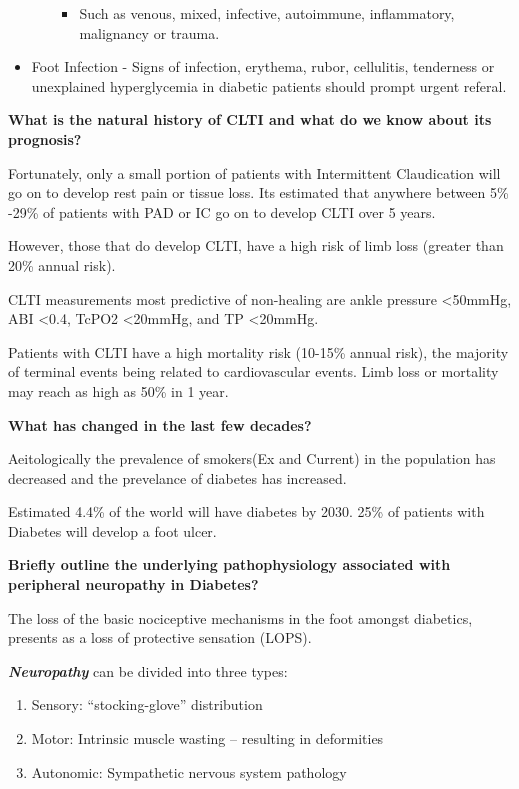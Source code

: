 \documentclass[
]{book}
\providecommand{\tightlist}{%
  \setlength{\itemsep}{0pt}\setlength{\parskip}{0pt}}
\begin{document}
\begin{itemize}
\begin{itemize}
    \begin{itemize}
    \tightlist
    \item
      Such as venous, mixed, infective, autoimmune, inflammatory,
      malignancy or trauma.
    \end{itemize}
  \end{itemize}
\item
  Foot Infection - Signs of infection, erythema, rubor, cellulitis,
  tenderness or unexplained hyperglycemia in diabetic patients should
  prompt urgent referal.\citep{kalish2010}
\end{itemize}

\textbf{What is the natural history of CLTI and what do we know about its
prognosis?}

Fortunately, only a small portion of patients with Intermittent
Claudication will go on to develop rest pain or tissue loss. Its
estimated that anywhere between 5\% -29\% of patients with PAD or IC go on
to develop CLTI over 5 years.

However, those that do develop CLTI, have a high risk of limb loss
(greater than 20\% annual risk).

CLTI measurements most predictive of non-healing are ankle pressure
\textless50mmHg, ABI \textless0.4, TcPO2 \textless20mmHg, and TP
\textless20mmHg.\citep{gerhard-herman2017, wickström2017}

Patients with CLTI have a high mortality risk (10-15\% annual
risk), the majority of terminal events being related to cardiovascular
events. Limb loss or mortality may reach as high as 50\% in 1 year.
\citep{adam2005, norgren2007}

\textbf{What has changed in the last few decades?}

Aeitologically the prevalence of smokers(Ex and Current) in the population
has decreased and the prevelance of diabetes has increased.

Estimated 4.4\% of the world will have diabetes by 2030. 25\% of patients
with Diabetes will develop a foot ulcer.

\textbf{Briefly outline the underlying pathophysiology associated with
peripheral neuropathy in Diabetes?}

The loss of the basic nociceptive mechanisms in the foot amongst
diabetics, presents as a loss of protective sensation (LOPS).

\textbf{\emph{Neuropathy}} can be divided into three types:

\begin{enumerate}
\def\labelenumi{\arabic{enumi}.}
\item
  Sensory: ``stocking-glove'' distribution
\item
  Motor: Intrinsic muscle wasting -- resulting in deformities
\item
  Autonomic: Sympathetic nervous system pathology
\end{enumerate}
\end{document}
